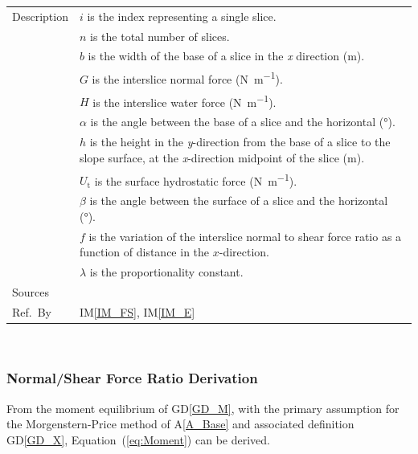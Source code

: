\documentclass[12pt]{article}
\newcommand{\colAwidth}{0.13\textwidth}
\newcommand{\colBwidth}{0.82\textwidth}
\newcommand{\aref}[1]{A\ref{#1}}
\newcommand{\iref}[1]{IM\ref{#1}}
\newcommand{\dref}[1]{GD\ref{#1}}
\begin{document}
\begin{minipage}{\textwidth}
\begin{tabular}{| p{\colAwidth} | p{\colBwidth} |}
\hline Description & $i$ is the index representing a single slice.\\
&$n$ is the total number of slices.\\
&$b$ is the width of the base of a slice in the \textit{x} direction 
(\si{\meter}).\\
&$G$ is the interslice normal force (\si{\newton\per\meter}).\\
&$H$ is the interslice water force (\si{\newton\per\meter}). \\
&$\alpha$ is the angle between the base of a slice and the 
horizontal (\si{\degree}). \\
&$h$ is the height in the \textit{y}-direction from the base of a slice 
to the slope surface, at the \textit{x}-direction midpoint of the slice 
(\si{\meter}).\\
&$U_\text{t}$ is the surface hydrostatic force (\si{\newton\per\meter}).\\
&$\beta$ is the angle between the surface of a slice and the 
horizontal (\si{\degree}). \\
&$f$ is the variation of the interslice normal to shear force ratio as a 
function of distance in the $x$-direction. \\
&$\lambda$ is the proportionality constant.\\

\hline Sources& \cite{ZhuEtAl2005}\\

\hline Ref.\ By & \iref{IM_FS}, \iref{IM_E} \\

\hline
\end{tabular}
\end{minipage}\\


\subsubsection*{Normal/Shear Force Ratio Derivation}

 From the moment equilibrium of \dref{GD_M}, with the primary assumption for 
 the Morgenstern-Price method of \aref{A_Base} and associated definition 
 \dref{GD_X}, Equation~(\ref{eq:Moment}) can be derived.
\end{document}
